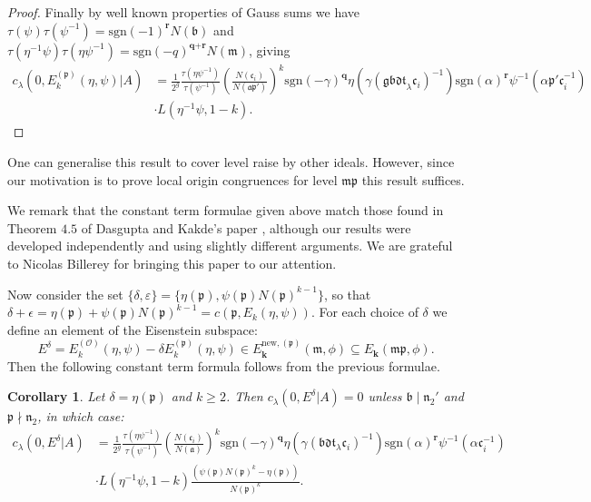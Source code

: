 \documentclass[a4paper,oneside]{amsart}
\theoremstyle{plain}
\newtheorem{cor}[thm]{Corollary}
\theoremstyle{definition}
\begin{document}
\begin{proof}
Finally by well known properties of Gauss sums we have $\tau(\psi)\tau(\psi^{-1}) = \text{sgn}(-1)^{\textbf{r}}N(\mathfrak{b})$ and $\tau(\eta^{-1}\psi)\tau(\eta\psi^{-1}) = \text{sgn}(-q)^{\textbf{q}+\textbf{r}}N(\mathfrak{m})$, giving \begin{align*}c_{\lambda}(0,E_k^{(\mathfrak{p})}(\eta,\psi)|A) &= \frac{1}{2^g}\frac{\tau(\eta\psi^{-1})}{\tau(\psi^{-1})}\left(\frac{N(\mathfrak{c}_i)}{N(\mathfrak{ap'})}\right)^k\text{sgn}(-\gamma)^{\textbf{q}}\eta(\gamma(\mathfrak{gbdt}_{\lambda}\mathfrak{c}_i)^{-1})\text{sgn}(\alpha)^{\textbf{r}}\psi^{-1}(\alpha\mathfrak{p'c}_i^{-1})\\ &\cdot L(\eta^{-1}\psi,1-k).\end{align*}


\end{proof}

One can generalise this result to cover level raise by other ideals. However, since our motivation is to prove local origin congruences for level $\mathfrak{mp}$ this result suffices.

We remark that the constant term formulae given above match those found in Theorem $4.5$ of Dasgupta and Kakde's paper \cite{dasguptakakde}, although our results were developed independently and using slightly different arguments. We are grateful to Nicolas Billerey for bringing this paper to our attention.

Now consider the set $\{\delta, \varepsilon\}=\{\eta(\mathfrak{p}), \psi(\mathfrak{p})N(\mathfrak{p})^{k-1}\}$, so that $\delta + \epsilon = \eta(\mathfrak{p}) + \psi(\mathfrak{p})N(\mathfrak{p})^{k-1} = c(\mathfrak{p}, E_k(\eta, \psi))$. For each choice of $\delta$ we define an element of the Eisenstein subspace:
\begin{equation}
\label{eq:Edelta}
    E^\delta = E_k^{(\mathcal{O})}(\eta, \psi) - \delta E_k^{(\mathfrak{p})}(\eta, \psi) \in E_{\textbf{k}}^{\text{new},(\mathfrak{p})}(\mathfrak{m},\phi)\subseteq E_{\textbf{k}}(\mathfrak{mp},\phi).
\end{equation}
Then the following constant term formula follows from the previous formulae.

\begin{cor} \label{cor:E}
Let $\delta = \eta(\mathfrak{p})$ and $k\geq 2$. Then $c_{\lambda}(0,E^\delta|A) = 0$ unless $\mathfrak{b}\mid\mathfrak{n}_2'$ and $\mathfrak{p}\nmid\mathfrak{n}_2$, in which case: \begin{align*}c_{\lambda}(0,E^\delta|A) &= \frac{1}{2^g}\frac{\tau(\eta\psi^{-1})}{\tau(\psi^{-1})}\left(\frac{N(\mathfrak{c}_i)}{N(\mathfrak{a})}\right)^k\text{sgn}(-\gamma)^{\textbf{q}}\eta(\gamma(\mathfrak{bdt}_{\lambda}\mathfrak{c}_i)^{-1})\text{sgn}(\alpha)^{\textbf{r}}\psi^{-1}(\alpha\mathfrak{c}_i^{-1})\\ &\cdot L(\eta^{-1}\psi,1-k)\frac{(\psi(\mathfrak{p})N(\mathfrak{p})^k - \eta(\mathfrak{p}))}{N(\mathfrak{p})^k}.\end{align*}
\end{cor}
\end{document}
